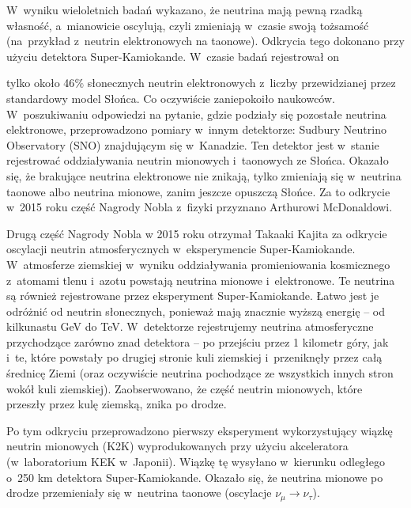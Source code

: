     W~wyniku wieloletnich badań wykazano, że neutrina mają pewną rzadką własność, a~mianowicie oscylują, czyli zmieniają w~czasie swoją tożsamość (na~przykład z~neutrin elektronowych na taonowe). 
Odkrycia tego dokonano przy użyciu detektora Super-Kamiokande. W~czasie badań rejestrował on
\eject
\begin{dwieszpalty}
  tylko około 46$\%$ słonecznych neutrin elektronowych z~liczby przewidzianej przez standardowy model Słońca. Co oczywiście zaniepokoiło naukowców. W~poszukiwaniu odpowiedzi na pytanie, gdzie podziały się pozostałe neutrina elektronowe, przeprowadzono pomiary w~innym detektorze: Sudbury Neutrino Observatory (SNO) znajdującym się w~Kanadzie. Ten detektor jest w~stanie rejestrować oddziaływania neutrin mionowych i~taonowych ze Słońca. Okazało się, że brakujące neutrina elektronowe nie znikają, tylko zmieniają się w~neutrina taonowe albo neutrina mionowe, zanim jeszcze opuszczą Słońce. Za to odkrycie w~2015 roku część Nagrody Nobla z~fizyki przyznano Arthurowi McDonaldowi. 


Drugą część Nagrody Nobla w 2015 roku otrzymał Takaaki Kajita za odkrycie oscylacji neutrin atmosferycznych w~eksperymencie Super-Kamiokande. W~atmosferze ziemskiej w~wyniku oddziaływania promieniowania kosmicznego z~atomami tlenu i~azotu powstają neutrina mionowe i~elektronowe. Te neutrina są również rejestrowane przez eksperyment Super-Kamiokande. Łatwo jest je odróżnić od neutrin słonecznych, ponieważ mają znacznie wyższą energię – od kilkunastu GeV do TeV. W~detektorze rejestrujemy neutrina atmosferyczne przychodzące zarówno znad detektora -- po przejściu przez 1 kilometr góry, jak i~te, które powstały po drugiej stronie kuli ziemskiej i~przeniknęły przez całą średnicę Ziemi (oraz oczywiście neutrina pochodzące ze wszystkich innych stron wokół kuli ziemskiej). Zaobserwowano, że część neutrin mionowych, które przeszły przez kulę ziemską, znika po drodze.

Po tym odkryciu przeprowadzono pierwszy eksperyment wykorzystujący wiązkę neutrin mionowych (K2K) wyprodukowanych przy użyciu akceleratora (w~laboratorium KEK w~Japonii). Wiązkę tę wysyłano w~kierunku odległego o~250 km detektora Super-Kamiokande. Okazało się, że neutrina mionowe po drodze przemieniały się w~neutrina taonowe (oscylacje $\nu_{\mu} \rightarrow \nu_{\tau}$).


\end{dwieszpalty}
